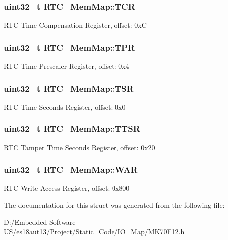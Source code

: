 \subsubsection[{T\+C\+R}]{\setlength{\rightskip}{0pt plus 5cm}uint32\+\_\+t R\+T\+C\+\_\+\+Mem\+Map\+::\+T\+C\+R}\label{struct_r_t_c___mem_map_ab816b0540497796070202cd2f5bc10ed}
R\+T\+C Time Compensation Register, offset\+: 0x\+C \hypertarget{struct_r_t_c___mem_map_a32641b62d548255bdf2164b457a2aaeb}{}
\subsubsection[{T\+P\+R}]{\setlength{\rightskip}{0pt plus 5cm}uint32\+\_\+t R\+T\+C\+\_\+\+Mem\+Map\+::\+T\+P\+R}\label{struct_r_t_c___mem_map_a32641b62d548255bdf2164b457a2aaeb}
R\+T\+C Time Prescaler Register, offset\+: 0x4 \hypertarget{struct_r_t_c___mem_map_a4ca4d2878d99736cbff0e8b107a275f2}{}
\subsubsection[{T\+S\+R}]{\setlength{\rightskip}{0pt plus 5cm}uint32\+\_\+t R\+T\+C\+\_\+\+Mem\+Map\+::\+T\+S\+R}\label{struct_r_t_c___mem_map_a4ca4d2878d99736cbff0e8b107a275f2}
R\+T\+C Time Seconds Register, offset\+: 0x0 \hypertarget{struct_r_t_c___mem_map_a15cd6b1d2a7664e4280746a810d2583f}{}
\subsubsection[{T\+T\+S\+R}]{\setlength{\rightskip}{0pt plus 5cm}uint32\+\_\+t R\+T\+C\+\_\+\+Mem\+Map\+::\+T\+T\+S\+R}\label{struct_r_t_c___mem_map_a15cd6b1d2a7664e4280746a810d2583f}
R\+T\+C Tamper Time Seconds Register, offset\+: 0x20 \hypertarget{struct_r_t_c___mem_map_aa3d2abe1fdd440a05339c38d377a2ee6}{}
\subsubsection[{W\+A\+R}]{\setlength{\rightskip}{0pt plus 5cm}uint32\+\_\+t R\+T\+C\+\_\+\+Mem\+Map\+::\+W\+A\+R}\label{struct_r_t_c___mem_map_aa3d2abe1fdd440a05339c38d377a2ee6}
R\+T\+C Write Access Register, offset\+: 0x800 

The documentation for this struct was generated from the following file\+:\begin{DoxyCompactItemize}
\item 
D\+:/\+Embedded Software U\+S/es18aut13/\+Project/\+Static\+\_\+\+Code/\+I\+O\+\_\+\+Map/\hyperlink{_m_k70_f12_8h}{M\+K70\+F12.\+h}\end{DoxyCompactItemize}
